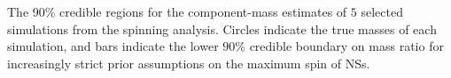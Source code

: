 \label{fig:comp_masses} The 90\% credible regions for the component-mass estimates of $5$ selected simulations from the spinning analysis.  Circles indicate the true masses of each simulation, and bars indicate the lower $90\%$ credible boundary on mass ratio for increasingly strict prior assumptions on the maximum spin of NSs.